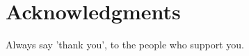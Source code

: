 \documentclass[class=scrbook, crop=false]{standalone}
\begin{document}
\chapter{Acknowledgments}
\label{Chapter: Acknowledgments}
    Always say 'thank you', to the people who support you.
\end{document}
